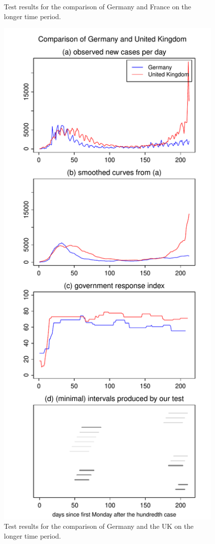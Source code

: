 \documentclass[a4paper,12pt]{article}
\numberwithin{equation}{section}
\begin{document}
\begin{figure}[h!]
\begin{minipage}[t]{0.49\textwidth}
\caption{Test results for the comparison of Germany and France on the longer time period.}
\end{minipage}
\hspace{0.25cm}
\begin{minipage}[t]{0.49\textwidth}
\includegraphics[width=\textwidth]{plots/DEU_vs_GBR_long}
\caption{Test results for the comparison of Germany and the UK on the longer time period.}
\end{minipage}
\end{figure}
\end{document}
